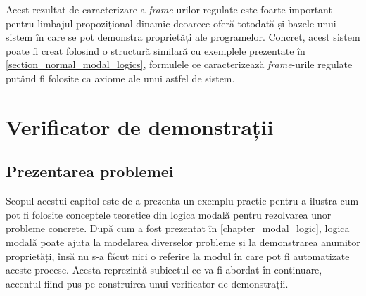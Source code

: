 \documentclass[12pt, openany]{book}
\newcommand{\mysectionreference}[1]{\autoref{#1}}
\begin{document}
            \par{}
                Acest rezultat de caracterizare a \textit{frame}-urilor regulate este foarte important pentru limbajul 
                propozițional dinamic deoarece oferă totodată și bazele unui sistem în care se pot demonstra proprietăți 
                ale programelor. Concret, acest sistem poate fi creat folosind o structură similară cu exemplele 
                prezentate în \mysectionreference{section_normal_modal_logics}, formulele ce caracterizează 
                \textit{frame}-urile regulate putând fi folosite ca axiome ale unui astfel de sistem.

    \chapter{Verificator de demonstrații} %
    \label{chapter_demonstration_checker}

        \section{Prezentarea problemei} %
        \label{section_intro_checker}
            \par{}
                Scopul acestui capitol este de a prezenta un exemplu practic pentru a ilustra cum pot fi folosite conceptele 
                teoretice din logica modală pentru rezolvarea unor probleme concrete. După cum a fost prezentat în 
                \mysectionreference{chapter_modal_logic}, logica modală poate ajuta la modelarea diverselor probleme și la
                demonstrarea anumitor proprietăți, însă nu s-a făcut nici o referire la modul în care pot fi automatizate 
                aceste procese. Acesta reprezintă subiectul ce va fi abordat în continuare, accentul fiind pus pe 
                construirea unui verificator de demonstrații.
\end{document}
